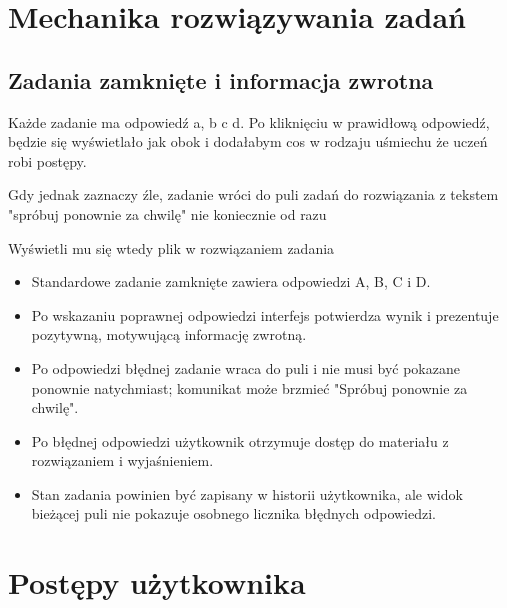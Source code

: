 \documentclass[12pt,a4paper]{report}
\begin{document}
\chapter{Mechanika rozwiązywania zadań}
\section{Zadania zamknięte i informacja zwrotna}
\begin{ElearnReviewComment}[title={Komentarz nr 9 -- Anna Kogut, 2026-07-22}]
Każde zadanie ma odpowiedź a, b c d. Po kliknięciu w prawidłową odpowiedź, będzie się wyświetlało jak obok i dodałabym cos w rodzaju uśmiechu że uczeń robi postępy.

Gdy jednak zaznaczy źle, zadanie wróci do puli zadań do rozwiązania z tekstem "spróbuj ponownie za chwilę" nie koniecznie od razu

Wyświetli mu się wtedy plik w rozwiązaniem zadania
\end{ElearnReviewComment}
\begin{ElearnRequirement}[title={Wymagania wynikające z komentarza}]
\begin{itemize}
  \item Standardowe zadanie zamknięte zawiera odpowiedzi A, B, C i D.
  \item Po wskazaniu poprawnej odpowiedzi interfejs potwierdza wynik i prezentuje pozytywną, motywującą informację zwrotną.
  \item Po odpowiedzi błędnej zadanie wraca do puli i nie musi być pokazane ponownie natychmiast; komunikat może brzmieć "Spróbuj ponownie za chwilę".
  \item Po błędnej odpowiedzi użytkownik otrzymuje dostęp do materiału z rozwiązaniem i wyjaśnieniem.
  \item Stan zadania powinien być zapisany w historii użytkownika, ale widok bieżącej puli nie pokazuje osobnego licznika błędnych odpowiedzi.
\end{itemize}
\end{ElearnRequirement}
\clearpage
\chapter{Postępy użytkownika}
\end{document}
